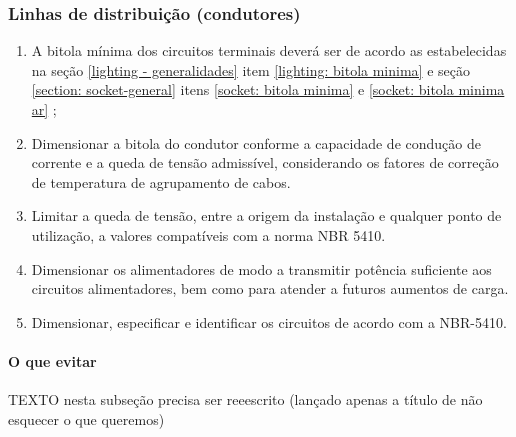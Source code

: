 \subsubsection{Linhas de distribuição (condutores)}

\begin{enumerate}
	\item A bitola mínima dos circuitos terminais deverá ser de acordo as estabelecidas na seção \ref{lighting - generalidades} item \ref{lighting: bitola minima} e seção \ref{section: socket-general} itens \ref{socket: bitola minima} e \ref{socket: bitola minima ar} ;

	\item Dimensionar a bitola do condutor conforme a capacidade de condução de corrente e a queda de tensão admissível, considerando os fatores de correção de temperatura de agrupamento de cabos. 

	\item Limitar a queda de tensão, entre a origem da instalação e qualquer ponto de utilização, a valores compatíveis com a norma NBR 5410. 

	\item Dimensionar os alimentadores de modo a transmitir potência suficiente aos circuitos alimentadores, bem como para atender a futuros aumentos de carga. 

	\item Dimensionar, especificar e identificar os circuitos de acordo com a NBR-5410.
	
\end{enumerate}

\paragraph{O que evitar}

TEXTO nesta subseção precisa ser reeescrito (lançado apenas a título de não esquecer o que queremos)

